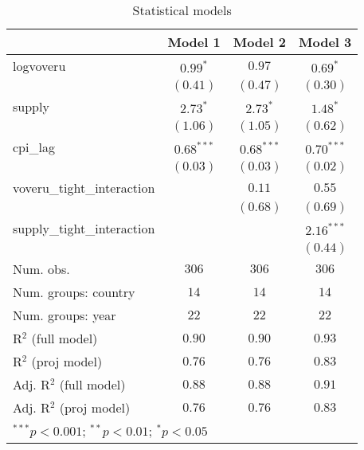 
\begin{table}
\begin{center}
\begin{tabular}{l c c c}
\hline
 & Model 1 & Model 2 & Model 3 \\
\hline
logvoveru                  & $0.99^{*}$   & $0.97$       & $0.69^{*}$   \\
                           & $(0.41)$     & $(0.47)$     & $(0.30)$     \\
supply                     & $2.73^{*}$   & $2.73^{*}$   & $1.48^{*}$   \\
                           & $(1.06)$     & $(1.05)$     & $(0.62)$     \\
cpi\_lag                   & $0.68^{***}$ & $0.68^{***}$ & $0.70^{***}$ \\
                           & $(0.03)$     & $(0.03)$     & $(0.02)$     \\
voveru\_tight\_interaction &              & $0.11$       & $0.55$       \\
                           &              & $(0.68)$     & $(0.69)$     \\
supply\_tight\_interaction &              &              & $2.16^{***}$ \\
                           &              &              & $(0.44)$     \\
\hline
Num. obs.                  & $306$        & $306$        & $306$        \\
Num. groups: country       & $14$         & $14$         & $14$         \\
Num. groups: year          & $22$         & $22$         & $22$         \\
R$^2$ (full model)         & $0.90$       & $0.90$       & $0.93$       \\
R$^2$ (proj model)         & $0.76$       & $0.76$       & $0.83$       \\
Adj. R$^2$ (full model)    & $0.88$       & $0.88$       & $0.91$       \\
Adj. R$^2$ (proj model)    & $0.76$       & $0.76$       & $0.83$       \\
\hline
\multicolumn{4}{l}{\scriptsize{$^{***}p<0.001$; $^{**}p<0.01$; $^{*}p<0.05$}}
\end{tabular}
\caption{Statistical models}
\label{table:coefficients}
\end{center}
\end{table}

